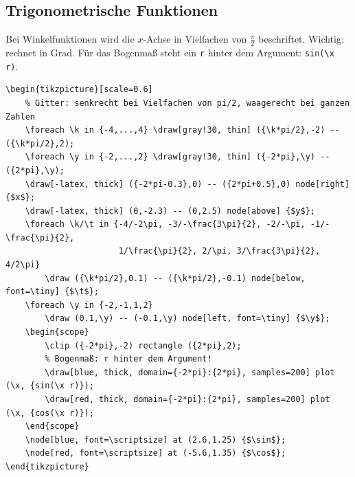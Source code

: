 \subsection{Trigonometrische Funktionen}

Bei Winkelfunktionen wird die $x$-Achse in Vielfachen von $\frac{\pi}{2}$ beschriftet. Wichtig: \TikZ rechnet in Grad. Für das Bogenmaß steht ein \texttt{r} hinter dem Argument: \texttt{sin(\textbackslash x r)}.

\begin{lstlisting}[style=latex]
\begin{tikzpicture}[scale=0.6]
	% Gitter: senkrecht bei Vielfachen von pi/2, waagerecht bei ganzen Zahlen
	\foreach \k in {-4,...,4} \draw[gray!30, thin] ({\k*pi/2},-2) -- ({\k*pi/2},2);
	\foreach \y in {-2,...,2} \draw[gray!30, thin] ({-2*pi},\y) -- ({2*pi},\y);
	\draw[-latex, thick] ({-2*pi-0.3},0) -- ({2*pi+0.5},0) node[right] {$x$};
	\draw[-latex, thick] (0,-2.3) -- (0,2.5) node[above] {$y$};
	\foreach \k/\t in {-4/-2\pi, -3/-\frac{3\pi}{2}, -2/-\pi, -1/-\frac{\pi}{2},
	                   1/\frac{\pi}{2}, 2/\pi, 3/\frac{3\pi}{2}, 4/2\pi}
		\draw ({\k*pi/2},0.1) -- ({\k*pi/2},-0.1) node[below, font=\tiny] {$\t$};
	\foreach \y in {-2,-1,1,2}
		\draw (0.1,\y) -- (-0.1,\y) node[left, font=\tiny] {$\y$};
	\begin{scope}
		\clip ({-2*pi},-2) rectangle ({2*pi},2);
		% Bogenmaß: r hinter dem Argument!
		\draw[blue, thick, domain={-2*pi}:{2*pi}, samples=200] plot (\x, {sin(\x r)});
		\draw[red, thick, domain={-2*pi}:{2*pi}, samples=200] plot (\x, {cos(\x r)});
	\end{scope}
	\node[blue, font=\scriptsize] at (2.6,1.25) {$\sin$};
	\node[red, font=\scriptsize] at (-5.6,1.35) {$\cos$};
\end{tikzpicture}
\end{lstlisting}

